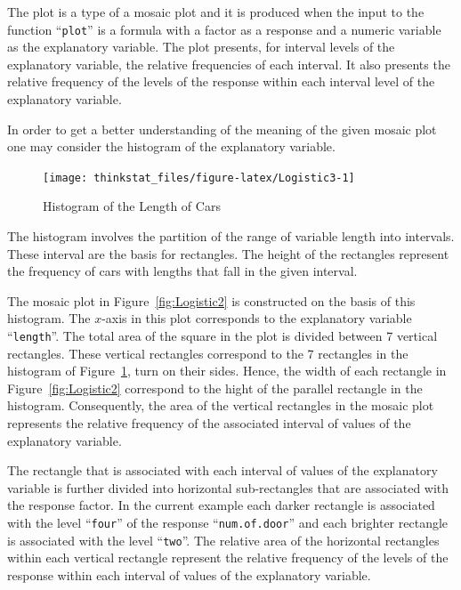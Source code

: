 \documentclass[]{krantz}
\makeatletter
\newenvironment{Shaded}{\begin{snugshade}}{\end{snugshade}}
\newcommand{\KeywordTok}[1]{\textcolor[rgb]{0.13,0.29,0.53}{\textbf{#1}}}
\newcommand{\OperatorTok}[1]{\textcolor[rgb]{0.81,0.36,0.00}{\textbf{#1}}}
\newcommand{\NormalTok}[1]{#1}
\newenvironment{kframe}{%
\medskip{}
\setlength{\fboxsep}{.8em}
 \def\at@end@of@kframe{}%
 \ifinner\ifhmode%
  \def\at@end@of@kframe{\end{minipage}}%
  \begin{minipage}{\columnwidth}%
 \fi\fi%
 \def\FrameCommand##1{\hskip\@totalleftmargin \hskip-\fboxsep
 \colorbox{shadecolor}{##1}\hskip-\fboxsep
     \hskip-\linewidth \hskip-\@totalleftmargin \hskip\columnwidth}%
 \MakeFramed {\advance\hsize-\width
   \@totalleftmargin\z@ \linewidth\hsize
   \@setminipage}}%
 {\par\unskip\endMakeFramed%
 \at@end@of@kframe}
\renewenvironment{Shaded}{\begin{kframe}}{\end{kframe}}
\theoremstyle{definition}
\theoremstyle{definition}
\theoremstyle{definition}
\theoremstyle{remark}
\makeatother
\begin{document}
The plot is a type of a mosaic plot and it is produced when the input to
the function ``\texttt{plot}'' is a formula with a factor as a response
and a numeric variable as the explanatory variable. The plot presents,
for interval levels of the explanatory variable, the relative
frequencies of each interval. It also presents the relative frequency of
the levels of the response within each interval level of the explanatory
variable.

In order to get a better understanding of the meaning of the given
mosaic plot one may consider the histogram of the explanatory variable.

\begin{Shaded}
\end{Shaded}

\begin{figure}

{\centering \texttt{[image: thinkstat\_files/figure-latex/Logistic3-1]} 

}

\caption{Histogram of the Length of Cars}\label{fig:Logistic3}
\end{figure}

The histogram involves the partition of the range of variable length
into intervals. These interval are the basis for rectangles. The height
of the rectangles represent the frequency of cars with lengths that fall
in the given interval.

The mosaic plot in Figure~\ref{fig:Logistic2} is constructed on the
basis of this histogram. The \(x\)-axis in this plot corresponds to the
explanatory variable ``\texttt{length}''. The total area of the square
in the plot is divided between 7 vertical rectangles. These vertical
rectangles correspond to the 7 rectangles in the histogram of
Figure~\ref{fig:Logistic3}, turn on their sides. Hence, the width of
each rectangle in Figure~\ref{fig:Logistic2} correspond to the hight of
the parallel rectangle in the histogram. Consequently, the area of the
vertical rectangles in the mosaic plot represents the relative frequency
of the associated interval of values of the explanatory variable.

The rectangle that is associated with each interval of values of the
explanatory variable is further divided into horizontal sub-rectangles
that are associated with the response factor. In the current example
each darker rectangle is associated with the level ``\texttt{four}'' of
the response ``\texttt{num.of.door}'' and each brighter rectangle is
associated with the level ``\texttt{two}''. The relative area of the
horizontal rectangles within each vertical rectangle represent the
relative frequency of the levels of the response within each interval of
values of the explanatory variable.
\end{document}
